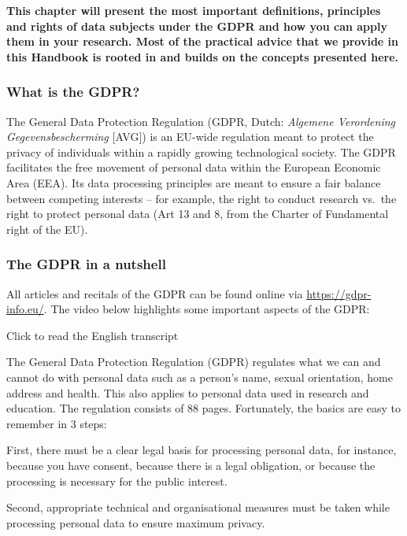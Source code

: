 \documentclass[
]{book}
\begin{document}
\textbf{This chapter will present the most important definitions, principles and rights of data subjects under the GDPR and how you can apply them in your research. Most of the practical advice that we provide in this Handbook is rooted in and builds on the concepts presented here.}

\hypertarget{what-is-the-gdpr}{%
\subsubsection{What is the GDPR?}\label{what-is-the-gdpr}}

The General Data Protection Regulation (GDPR, Dutch: \emph{Algemene Verordening Gegevensbescherming} {[}AVG{]}) is an EU-wide regulation meant to protect the privacy of individuals within a rapidly growing technological society. The GDPR facilitates the free movement of personal data within the European Economic Area (EEA). Its data processing principles are meant to ensure a fair balance between competing interests -- for example, the right to conduct research vs.~the right to protect personal data (Art 13 and 8, from the Charter of Fundamental right of the EU).

\hypertarget{the-gdpr-in-a-nutshell}{%
\subsubsection{The GDPR in a nutshell}\label{the-gdpr-in-a-nutshell}}

All articles and recitals of the GDPR can be found online via \url{https://gdpr-info.eu/}. The video below highlights some important aspects of the GDPR:

Click to read the English transcript

The General Data Protection Regulation (GDPR) regulates what we can and cannot do with personal data such as a person's name, sexual orientation, home address and health. This also applies to personal data used in research and education. The regulation consists of 88 pages. Fortunately, the basics are easy to remember in 3 steps:

First, there must be a clear legal basis for processing personal data, for instance, because you have consent, because there is a legal obligation, or because the processing is necessary for the public interest.

Second, appropriate technical and organisational measures must be taken while processing personal data to ensure maximum privacy.
\end{document}
